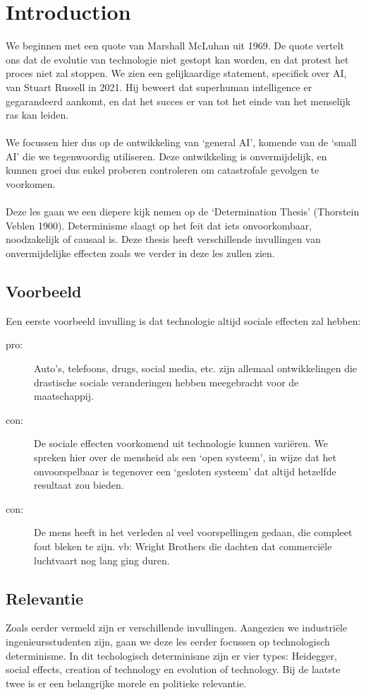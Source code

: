 \documentclass[../summary.tex]{subfiles}
\begin{document}
	
	\section{Introduction}
	We beginnen met een quote van Marshall McLuhan uit 1969. De quote vertelt ons dat de evolutie van technologie niet gestopt kan worden, en dat protest het proces niet zal stoppen. We zien een gelijkaardige statement, specifiek over AI, van Stuart Russell in 2021. Hij beweert dat superhuman intelligence er gegarandeerd aankomt, en dat het succes er van tot het einde van het menselijk ras kan leiden.  \\
	\\
	We focussen hier dus op de ontwikkeling van `general AI', komende van de `small AI' die we tegenwoordig utiliseren. Deze ontwikkeling is onvermijdelijk, en kunnen groei dus enkel proberen controleren om catastrofale gevolgen te voorkomen. \\
	\\	
	Deze les gaan we een diepere kijk nemen op de `Determination Thesis' (Thorstein Veblen 1900). Determinisme slaagt op het feit dat iets onvoorkombaar, noodzakelijk of causaal is. Deze thesis heeft verschillende invullingen van onvermijdelijke effecten zoals we verder in deze les zullen zien.  \\
	
	\subsection{Voorbeeld}
	Een eerste voorbeeld invulling is dat technologie altijd sociale effecten zal hebben:
	\begin{description}
		\item[pro:] Auto's, telefoons, drugs, social media, etc. zijn allemaal ontwikkelingen die drastische sociale veranderingen hebben meegebracht voor de maatschappij.
		\item[con:] De sociale effecten voorkomend uit technologie kunnen variëren. We spreken hier over de mensheid als een `open systeem', in wijze dat het onvoorspelbaar is tegenover een `gesloten systeem' dat altijd hetzelfde resultaat zou bieden.
		\item[con:]  De mens heeft in het verleden al veel voorspellingen gedaan, die compleet fout bleken te zijn. vb: Wright Brothers die dachten dat commerciële luchtvaart nog lang ging duren.
	\end{description}
	
	\subsection{Relevantie}
	Zoals eerder vermeld zijn er verschillende invullingen. Aangezien we industriële ingenieursstudenten zijn, gaan we deze les eerder focussen op technologisch determinisme. In dit techologisch determinisme zijn er vier types: Heidegger, social effects, creation of technology en evolution of technology. Bij de laatste twee is er een belangrijke morele en politieke relevantie.
	
\end{document}
